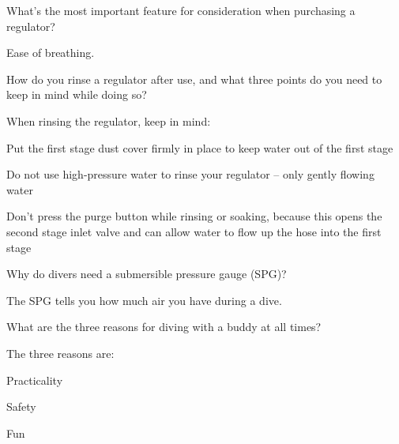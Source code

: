 	\begin{qanda}
		\begin{question}
What's the most important feature for consideration when purchasing a regulator?
		\end{question}

		\begin{answer}
Ease of breathing.
		\end{answer}
	\end{qanda}

	\begin{qanda}
		\begin{question}
How do you rinse a regulator after use, and what three points do you need to keep in mind while doing so?
		\end{question}

		\begin{answer}
When rinsing the regulator, keep in mind:
			\begin{nospacenumberedlist}
				\item Put the first stage dust cover firmly in place to keep water out of the first stage
				\item Do not use high-pressure water to rinse your regulator -- only gently flowing water
				\item Don't press the purge button while rinsing or soaking, because this opens the second stage inlet valve and can allow water to flow up the hose into the first stage
			\end{nospacenumberedlist}
		\end{answer}
	\end{qanda}

	\begin{qanda}
		\begin{question}
Why do divers need a submersible pressure gauge (SPG)?
		\end{question}

		\begin{answer}
The SPG tells you how much air you have during a dive.
		\end{answer}
	\end{qanda}

	\begin{qanda}
		\begin{question}
What are the three reasons for diving with a buddy at all times?
		\end{question}

		\begin{answer}
The three reasons are:
			\begin{nospacenumberedlist}
				\item Practicality
				\item Safety
				\item Fun
			\end{nospacenumberedlist}
		\end{answer}
	\end{qanda} 